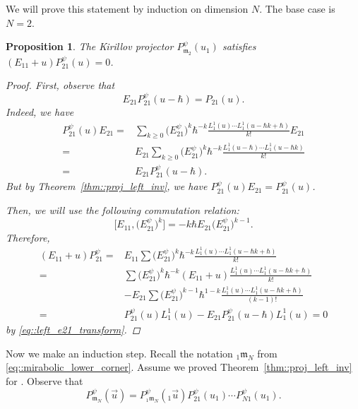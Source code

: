 \documentclass[10pt,a4paper]{article}
\numberwithin{equation}{section}
\newtheorem{Proposition}[Theorem]{Proposition}
{ \theoremstyle{definition}
	\newtheorem{Definition}[Theorem]{Definition}
	\newtheorem{Note}[Theorem]{Note}
	\newtheorem{Example}[Theorem]{Example}
	\newtheorem{Remark}[Theorem]{Remark} }
\newcommand{\m}{\mathfrak{m}}
\begin{document}
	We will prove this statement by induction on dimension $N$. The base case is $N=2$.
	
	\begin{Proposition}
		\label{prop::proj_left_inv_gl2}
		The Kirillov projector $P_{\m_2}^{\psi}(u_1)$ satisfies
	$
			(E_{11} + u) P_{21}^{\psi}(u) = 0$.
		\begin{proof}
			First, observe that
			\begin{equation}
				\label{eq::left_e21_transform}
				E_{21} P^{\psi}_{21}(u-\hbar) = P_{21}(u).
			\end{equation}
			Indeed, we have
			\begin{align*}
				P_{21}^{\psi}(u) E_{21} ={}& \sum\limits_{k\geq 0} \bigl(E_{21}^{\psi}\bigr)^k \hbar^{-k} \frac{L_1^1(u) \cdots L_1^1(u-\hbar k+\hbar)}{k!} E_{21} \\
				= {}& E_{21} \sum\limits_{k\geq 0} \bigl(E_{21}^{\psi}\bigr)^k \hbar^{-k} \frac{L_1^1(u-\hbar) \cdots L_1^1(u-\hbar k)}{k!} \\
				= {}& E_{21} P_{21}^{\psi}(u-\hbar).
			\end{align*}
			But by Theorem~\ref{thm::proj_left_inv}, we have $P_{21}^{\psi}(u)E_{21} = P_{21}^{\psi}(u)$.
			
			Then, we will use the following commutation relation:
			\[
			\bigl[E_{11},\bigl(E_{21}^{\psi}\bigr)^k\bigr] = -k\hbar E_{21} \bigl(E_{21}^{\psi}\bigr)^{k-1}.
			\]
			Therefore,
			\begin{align*}
				(E_{11}+u) P_{21}^{\psi} = {}& E_{11} \sum \bigl(E_{21}^{\psi}\bigr)^k \hbar^{-k} \frac{L_1^1(u) \cdots L_1^1(u-\hbar k+\hbar)}{k!} \\
				={}& \sum \bigl(E_{21}^{\psi}\bigr)^k \hbar^{-k} (E_{11}+u) \frac{L_1^1(u) \cdots L_1^1(u-\hbar k+\hbar)}{k!} \\
				&- E_{21} \sum \bigl(E_{21}^{\psi}\bigr)^{k-1} \hbar^{1-k} \frac{L_1^1(u) \cdots L_1^1(u-\hbar k+\hbar)}{(k-1)!} \\
				={}& P_{21}^{\psi}(u) L_1^1(u) - E_{21} P_{21}^{\psi}(u-\hbar) L_1^1(u) = 0
			\end{align*}
			by \eqref{eq::left_e21_transform}.
		\end{proof}
	\end{Proposition}
	
	
	Now we make an induction step. Recall the notation ${}_1\m_{N}$ from \eqref{eq::mirabolic_lower_corner}. Assume we proved Theorem~\ref{thm::proj_left_inv} for \smash{$P_{{}_1\m_{N}}^{\psi}({}_1\vec{u})$}. Observe that
	\[
	P_{\m_N}^{\psi}(\vec{u}) = P_{{}_1\m_{N}}^{\psi}({}_1\vec{u}) P_{21}^{\psi}(u_1) \cdots P_{N1}^{\psi}(u_1).
	\]
	
\end{document}
